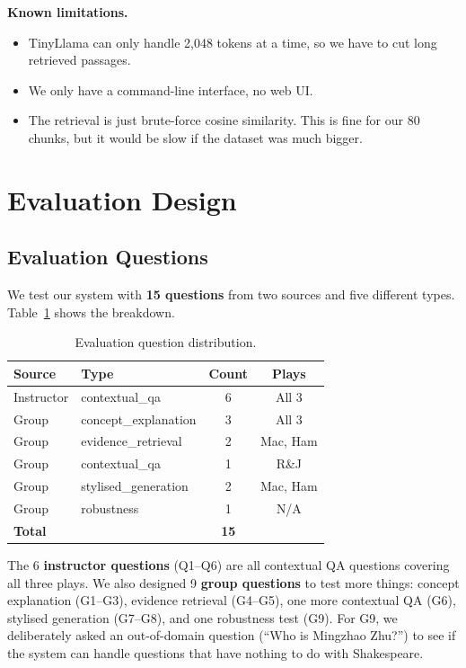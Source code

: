 \documentclass[10pt,conference]{IEEEtran}
\begin{document}
\textbf{Known limitations.}
\begin{itemize}
    \item TinyLlama can only handle 2,048 tokens at a time, so we have to cut long retrieved passages.
    \item We only have a command-line interface, no web UI.
    \item The retrieval is just brute-force cosine similarity. This is fine for our 80 chunks, but it would be slow if the dataset was much bigger.
\end{itemize}

\section{Evaluation Design}
\label{sec:evaluation-design}

\subsection{Evaluation Questions}

We test our system with \textbf{15 questions} from two sources and five different types. Table~\ref{tab:question-dist} shows the breakdown.

\begin{table}[h]
\centering
\caption{Evaluation question distribution.}
\label{tab:question-dist}
\begin{tabular}{llcc}
\toprule
Source & Type & Count & Plays \\
\midrule
Instructor & contextual\_qa & 6 & All 3 \\
\midrule
Group & concept\_explanation & 3 & All 3 \\
Group & evidence\_retrieval & 2 & Mac, Ham \\
Group & contextual\_qa & 1 & R\&J \\
Group & stylised\_generation & 2 & Mac, Ham \\
Group & robustness & 1 & N/A \\
\midrule
\textbf{Total} & & \textbf{15} & \\
\bottomrule
\end{tabular}
\end{table}

The 6 \textbf{instructor questions} (Q1--Q6) are all contextual QA questions covering all three plays. We also designed 9 \textbf{group questions} to test more things: concept explanation (G1--G3), evidence retrieval (G4--G5), one more contextual QA (G6), stylised generation (G7--G8), and one robustness test (G9). For G9, we deliberately asked an out-of-domain question (``Who is Mingzhao Zhu?'') to see if the system can handle questions that have nothing to do with Shakespeare.
\end{document}

